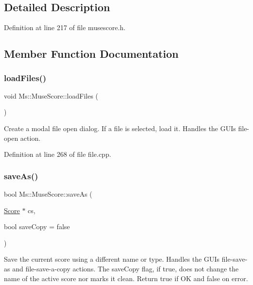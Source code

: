 \subsection{Detailed Description}


Definition at line 217 of file musescore.\+h.



\subsection{Member Function Documentation}
\mbox{\label{class_ms_1_1_muse_score_a63c6e3f1c30243bc7efff056adc786c0}} 
\subsubsection{\texorpdfstring{load\+Files()}{loadFiles()}}
{\footnotesize\ttfamily void Ms\+::\+Muse\+Score\+::load\+Files (\begin{DoxyParamCaption}{ }\end{DoxyParamCaption})}

Create a modal file open dialog. If a file is selected, load it. Handles the G\+UI\textquotesingle{}s file-\/open action. 

Definition at line 268 of file file.\+cpp.

\mbox{\label{class_ms_1_1_muse_score_a5e7076e8a4bf0ae711dd25ba29283061}} 
\subsubsection{\texorpdfstring{save\+As()}{saveAs()}}
{\footnotesize\ttfamily bool Ms\+::\+Muse\+Score\+::save\+As (\begin{DoxyParamCaption}\item[{\hyperlink{class_ms_1_1_score}{Score} $\ast$}]{cs,  }\item[{bool}]{save\+Copy = {\ttfamily false} }\end{DoxyParamCaption})}

Save the current score using a different name or type. Handles the G\+UI\textquotesingle{}s file-\/save-\/as and file-\/save-\/a-\/copy actions. The save\+Copy flag, if true, does not change the name of the active score nor marks it clean. Return true if OK and false on error. 

